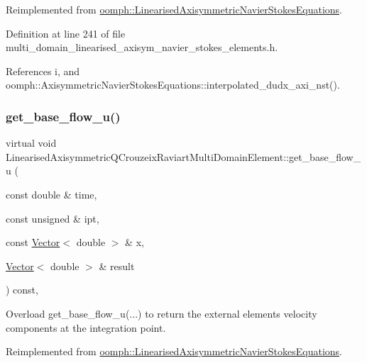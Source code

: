 Reimplemented from \hyperlink{classoomph_1_1LinearisedAxisymmetricNavierStokesEquations_aa3924125dde70779c180b84408271422}{oomph\+::\+Linearised\+Axisymmetric\+Navier\+Stokes\+Equations}.



Definition at line 241 of file multi\+\_\+domain\+\_\+linearised\+\_\+axisym\+\_\+navier\+\_\+stokes\+\_\+elements.\+h.



References i, and oomph\+::\+Axisymmetric\+Navier\+Stokes\+Equations\+::interpolated\+\_\+dudx\+\_\+axi\+\_\+nst().

\mbox{\label{classLinearisedAxisymmetricQCrouzeixRaviartMultiDomainElement_ad2f1cde1f47f056f58469c94c8ccea6d}} 
\subsubsection{\texorpdfstring{get\+\_\+base\+\_\+flow\+\_\+u()}{get\_base\_flow\_u()}}
{\footnotesize\ttfamily virtual void Linearised\+Axisymmetric\+Q\+Crouzeix\+Raviart\+Multi\+Domain\+Element\+::get\+\_\+base\+\_\+flow\+\_\+u (\begin{DoxyParamCaption}\item[{const double \&}]{time,  }\item[{const unsigned \&}]{ipt,  }\item[{const \hyperlink{classoomph_1_1Vector}{Vector}$<$ double $>$ \&}]{x,  }\item[{\hyperlink{classoomph_1_1Vector}{Vector}$<$ double $>$ \&}]{result }\end{DoxyParamCaption}) const\hspace{0.3cm}{\ttfamily [inline]}, {\ttfamily [virtual]}}



Overload get\+\_\+base\+\_\+flow\+\_\+u(...) to return the external element\textquotesingle{}s velocity components at the integration point. 



Reimplemented from \hyperlink{classoomph_1_1LinearisedAxisymmetricNavierStokesEquations_a74c8399c96e4870f831dcc01986a72cd}{oomph\+::\+Linearised\+Axisymmetric\+Navier\+Stokes\+Equations}.



